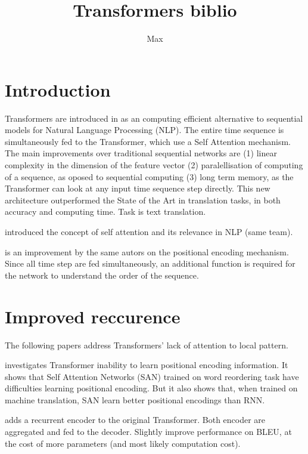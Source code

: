 \documentclass{article}
\title{Transformers biblio}
\author{Max}
\begin{document}
\maketitle

\section{Introduction}

    Transformers are introduced in \cite{Vaswani2017AttentionIA} as an computing efficient alternative to sequential models for Natural Language Processing (NLP). The entire time sequence is simultaneously fed to the Transformer, which use a Self Attention mechanism. The main improvements over traditional sequential networks are (1) linear complexity in the dimension of the feature vector (2) paralellisation of computing of a sequence, as oposed to sequential computing (3) long term memory, as the Transformer can look at any input time sequence step directly. This new architecture outperformed the State of the Art in translation tasks, in both accuracy and computing time. Task is text translation.

    \cite{Parikh2016ADA} introduced the concept of self attention and its relevance in NLP (same team).

    \cite{Shaw2018SelfAttentionWR} is an improvement by the same autors on the positional encoding mechanism. Since all time step are fed simultaneously, an additional function is required for the network to understand the order of the sequence.


\section{Improved reccurence}

    The following papers address Transformers' lack of attention to local pattern.

    \cite{Yang2019AssessingTA} investigates Transformer inability to learn positional encoding information. It shows that Self Attention Networks (SAN) trained on word reordering task have difficulties learning positional encoding. But it also shows that, when trained on machine translation, SAN learn better positional encodings than RNN.

    \cite{Hao2019ModelingRF} adds a recurrent encoder to the original Transformer. Both encoder are aggregated and fed to the decoder. Slightly improve performance on BLEU, at the cost of more parameters (and most likely computation cost).
\end{document}

